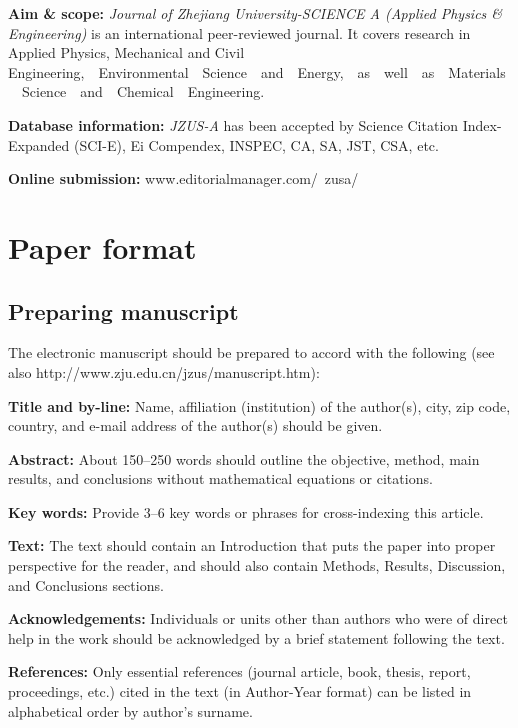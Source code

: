 \documentclass[twoside,twocolumn]{article}
\begin{document}
\noindent \textbf{Aim \& scope:}  \emph{Journal of Zhejiang University-SCIENCE A (Applied Physics {\sf \slshape \&} Engineering)} is an international peer-reviewed journal. It covers research in Applied Physics, Mechanical and Civil Engineering,\ \ Environmental\ \ Science\ \ and\ \ Energy,\ \ as\ \ well\ \ as\ \ Materials\ \ Science\ \ and\ \ Chemical\ \ Engineering.

\noindent \textbf{Database information:} \emph{JZUS-A} has been accepted by Science Citation Index-Expanded (SCI-E), Ei Compendex, INSPEC, CA, SA, JST, CSA, etc.

\noindent \textbf{Online submission:} www.editorialmanager.com/\ zusa/

\section{Paper format}

\subsection{Preparing manuscript}

The electronic manuscript should be prepared to accord with the following (see also http://www.zju.edu.cn/jzus/manuscript.htm):

\noindent \textbf{Title and by-line:} Name, affiliation (institution) of the author(s), city, zip code, country, and e-mail address of the author(s) should be given.

\noindent \textbf{Abstract:} About 150--250 words should outline the objective, method, main results, and conclusions without mathematical equations or citations.

\noindent \textbf{Key words:} Provide 3--6 key words or phrases for cross-indexing this article.

\noindent \textbf{Text:} The text should contain an Introduction that puts the paper into proper perspective for the reader, and should also contain Methods, Results, Discussion, and Conclusions sections.

\noindent \textbf{Acknowledgements:} Individuals or units other than authors who were of direct help in the work should be acknowledged by a brief statement following the text.

\noindent \textbf{References:} Only essential references (journal article, book, thesis, report, proceedings, etc.) cited in the text (in Author-Year format) can be listed in alphabetical order by author's surname.
\end{document}
